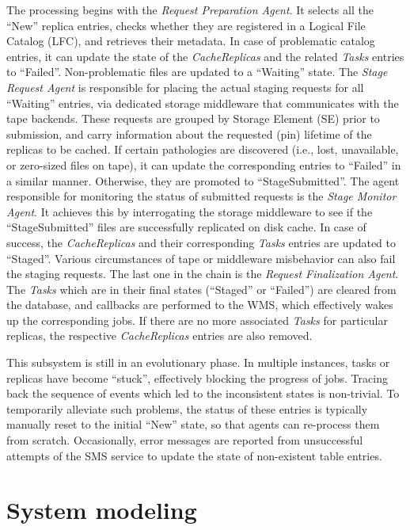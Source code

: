 \documentclass[10pt,conference]{IEEEtran}
\begin{document}
The processing begins with the \textit{Request Preparation Agent}. It selects all the
``New'' replica entries, checks whether they are registered in a Logical
File Catalog (LFC), and retrieves their metadata. In case of problematic catalog
entries, it can update the state of the \textit{CacheReplicas} and the related \textit{Tasks}
entries to ``Failed''. Non-problematic files are updated to a
``Waiting'' state. The \textit{Stage Request Agent} is responsible for placing the actual staging
requests for all ``Waiting'' entries, via dedicated storage middleware that
communicates with the tape backends. These requests are grouped by Storage Element (SE) prior to
submission, and carry information about the requested (pin) lifetime of the
replicas to be cached. If certain pathologies are discovered (i.e., lost,
unavailable, or zero-sized files on tape), it can update the corresponding
entries to ``Failed'' in a similar manner. Otherwise, they are promoted to
``StageSubmitted''. The agent responsible for monitoring the status of submitted
requests is the \textit{Stage Monitor Agent}. It achieves this by interrogating the
storage middleware to see if the ``StageSubmitted'' files are successfully
replicated on disk cache. In case of success, the \textit{CacheReplicas} and their
corresponding \textit{Tasks} entries are updated to ``Staged''. Various circumstances of
tape or middleware misbehavior can also fail the staging requests. The last one
in the chain is the \textit{Request Finalization Agent}. The \textit{Tasks} which are in their
final states (``Staged'' or ``Failed'') are cleared from the database, and callbacks
are performed to the WMS, which effectively wakes up the corresponding jobs. If
there are no more associated \textit{Tasks} for particular replicas, the respective
\textit{CacheReplicas} entries are also removed.

This subsystem is still in an evolutionary phase. In multiple instances, tasks or
replicas have become “stuck”, effectively blocking the progress of jobs. Tracing
back the sequence of events which led to the inconsistent states is non-trivial.
To temporarily alleviate such problems, the status of these entries is typically manually
reset to the initial ``New'' state, so that agents can re-process them from
scratch. Occasionally, error messages are reported from unsuccessful attempts of
the SMS service to update the state of non-existent table entries.

\section{System modeling}
\end{document}
